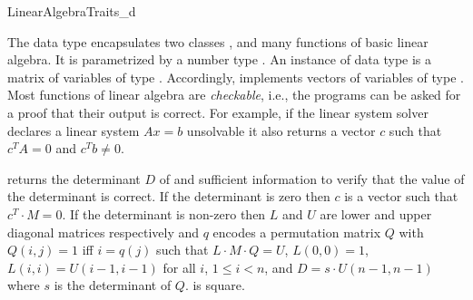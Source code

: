 \begin{ccRefConcept}{LinearAlgebraTraits_d}

\ccDefinition


The data type  encapsulates two classes
,  and many functions of basic linear algebra.
It is parametrized by a number type . An instance of data type
 is a matrix of variables of type . Accordingly,
 implements vectors of variables of type .  Most
functions of linear algebra are \emph{checkable}, i.e., the programs
can be asked for a proof that their output is correct. For example, if
the linear system solver declares a linear system $A x = b$ unsolvable
it also returns a vector $c$ such that $c^T A = 0$ and $c^T b \neq 0$.

\ccSetOneOfTwoColumns{5.5cm}
\ccTypes


\ccSetTwoOfThreeColumns{2cm}{1cm}

\ccOperations




 {returns the determinant $D$ of
   and sufficient information to verify that the value of the
  determinant is correct. If the determinant is zero then $c$ is a
  vector such that $c^T \cdot M = 0$. If the determinant is non-zero
  then $L$ and $U$ are lower and upper diagonal matrices respectively
  and $q$ encodes a permutation matrix $Q$ with $Q(i,j) = 1$ iff $i =
  q(j)$ such that $L \cdot M \cdot Q = U$, $L(0,0) = 1$, $L(i,i) = U(i
  - 1,i - 1)$ for all $i$, $1 \le i < n$, and $D = s \cdot U(n - 1,n -
  1)$ where $s$ is the determinant of $Q$. \ccPrecond {} is
  square.}


\end{ccRefConcept}
